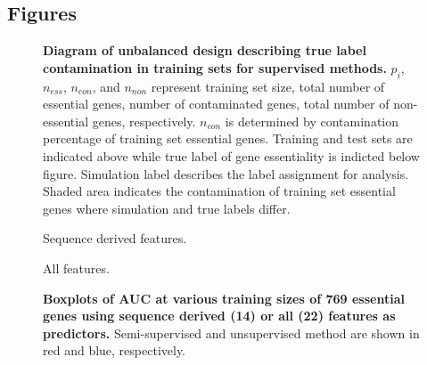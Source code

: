 \documentclass{bmcart}
\def\texttt{[image: ]}
\begin{document}
\begin{backmatter}


\section*{Figures}

\begin{figure}[ht]
    \centering
    \vspace{1cm}
        \caption{\textbf{Diagram of unbalanced design describing true label contamination in training sets for supervised methods.} $p_{i}$, $n_{ess}$, $n_{con}$, and $n_{non}$ represent training set size, total number of essential genes, number of contaminated genes, total number of non-essential genes, respectively. $n_{con}$ is determined by contamination percentage of training set essential genes. Training and test sets are indicated above while true label of gene essentiality is indicted below figure. Simulation label describes the label assignment for analysis. Shaded area indicates the contamination of training set essential genes where simulation and true labels differ.} \label{fig:diagram}

\end{figure}

\begin{figure}
    \centering
      \centering
        \caption{Sequence derived features.} \label{fig:unsup_seq}
        \centering
        \caption{All features.} \label{fig:unsup_all}
    \vspace{1cm}
    \caption{\textbf{Boxplots of AUC at various training sizes of 769 essential genes using sequence derived (14) or all (22) features as predictors.} Semi-supervised and unsupervised method are shown in red and blue, respectively.}
    \label{fig:unsup}
\end{figure}



\end{backmatter}
\end{document}

